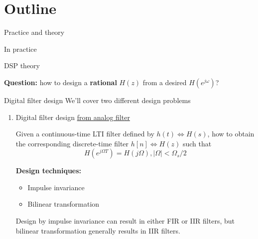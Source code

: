 \documentclass[10pt, handout]{beamer}
\begin{document}
%
\section{Outline}

\begin{frame}{Practice and theory}
\begin{block}{In practice}
	\vspace{-0.5cm}
	\begin{center}
		\resizebox{\linewidth}{!}{}
	\end{center}
\end{block}

\begin{block}{DSP theory}
	\vspace{-0.5cm}
	\begin{center}
		\def\Heff{1}
		\resizebox{\linewidth}{!}{}
	\end{center}
\end{block}

\pause
\textbf{Question:} how to design a \textbf{rational} $H(z)$ from a desired $H(e^{j\omega})$?
\end{frame}

\begin{frame}{Digital filter design}
	We'll cover two different design problems
	\begin{enumerate}
		\item Digital filter design \underline{from analog filter}
		
		Given a continuous-time LTI filter defined by $h(t) \Longleftrightarrow H(s)$, how to obtain the corresponding discrete-time filter $h[n] \Longleftrightarrow H(z)$ such that
		\begin{equation*}
			H(e^{j\Omega T}) = H(j\Omega), |\Omega| < \Omega_s/2
		\end{equation*}
		
		\textbf{Design techniques:}
		\begin{itemize}
			\item Impulse invariance
			\item Bilinear transformation
		\end{itemize}
		Design by impulse invariance can result in either FIR or IIR filters, but bilinear transformation generally results in IIR filters. 
	\end{enumerate}
\end{frame}
\end{document}
